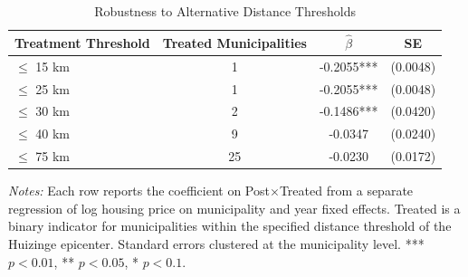 \begin{table}[htbp]
\centering
\begin{threeparttable}
\caption{Robustness to Alternative Distance Thresholds}
\label{tab:thresholds}
\begin{tabular}{lccc}
\toprule
Treatment Threshold & Treated Municipalities & $\hat{\beta}$ & SE \\
\midrule
$\leq$ 15 km & 1 & -0.2055*** & (0.0048) \\
$\leq$ 25 km & 1 & -0.2055*** & (0.0048) \\
$\leq$ 30 km & 2 & -0.1486*** & (0.0420) \\
$\leq$ 40 km & 9 & -0.0347 & (0.0240) \\
$\leq$ 75 km & 25 & -0.0230 & (0.0172) \\
\bottomrule
\end{tabular}
\begin{tablenotes}[flushleft]
\small
\item \textit{Notes:} Each row reports the coefficient on Post$\times$Treated from a separate regression of log housing price on municipality and year fixed effects. Treated is a binary indicator for municipalities within the specified distance threshold of the Huizinge epicenter. Standard errors clustered at the municipality level. *** $p<0.01$, ** $p<0.05$, * $p<0.1$.
\end{tablenotes}
\end{threeparttable}
\end{table}
